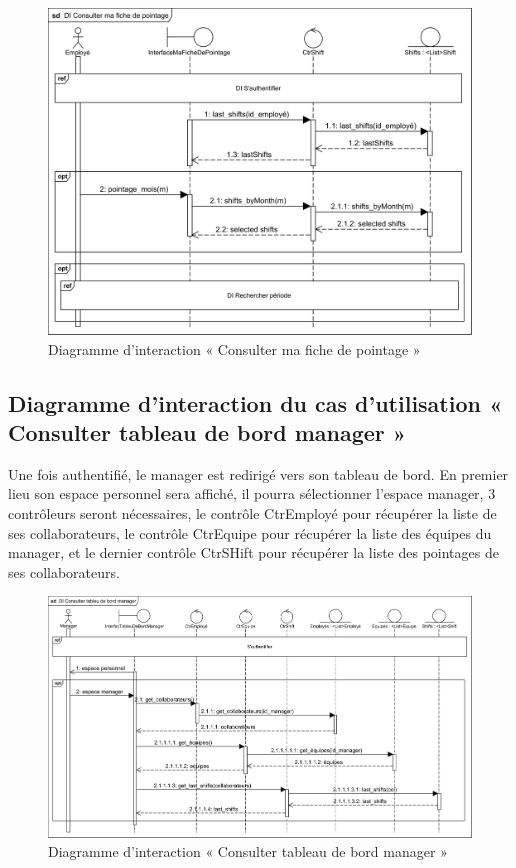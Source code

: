 \begin{figure}[h!]
    \centering
    \includegraphics[scale=0.86]{images/DS/DI Consulter ma fiche de pointage.png}
    \caption{Diagramme d'interaction « Consulter ma fiche de pointage »}
    \label{fig36}
\end{figure}    
        
\subsection*{Diagramme d'interaction du cas d'utilisation « Consulter tableau de bord manager »}
Une fois authentifié, le manager est redirigé vers son tableau de bord. En 
premier lieu son espace personnel sera affiché, il pourra sélectionner l’espace 
manager, 3 contrôleurs seront nécessaires, le contrôle CtrEmployé pour récupérer 
la liste de ses collaborateurs, le contrôle CtrEquipe pour récupérer la liste 
des équipes du manager, et le dernier contrôle CtrSHift pour récupérer la liste 
des pointages de ses collaborateurs.

\clearpage

\begin{figure}[h!]
    \centering
    \includegraphics[angle=90,scale=0.65]{images/DS/DI Consulter tableu de bord manager.png}
	\caption{Diagramme d'interaction « Consulter tableau de bord manager »}
    \label{fig37}
\end{figure}
        
